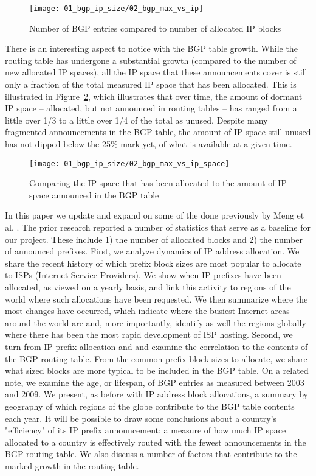 \begin{figure}[htbp]
	\centering
		\texttt{[image: 01\_bgp\_ip\_size/02\_bgp\_max\_vs\_ip]}
	\caption{Number of BGP entries compared to number of allocated IP blocks}
	\label{fig:BGP vs RIR}
\end{figure}

There is an interesting aspect to notice with the BGP table growth. While the
routing table has undergone a substantial growth (compared to the number of
new allocated IP spaces), all the IP space that these announcements cover is
still only a fraction of the total measured IP space that has been allocated.
This is illustrated in Figure~\ref{fig:BGP vs RIR space}, which illustrates
that over time, the amount of dormant IP space -- allocated, but not
announced in routing tables -- has ranged from a little over 1/3 to a little
over 1/4 of the total as unused. Despite many fragmented announcements in the
BGP table, the amount of IP space still unused has not dipped below the 25\%
mark yet, of what is available at a given time.

\begin{figure}[htbp]
	\centering
\texttt{[image: 01\_bgp\_ip\_size/02\_bgp\_max\_vs\_ip\_space]}
	\caption{Comparing the IP space that has been allocated to the amount of IP space announced in the BGP table}
	\label{fig:BGP vs RIR space}
\end{figure}

In this paper we update and expand on some of the done previously by Meng et
al. \cite{Meng:2005:IPv4-address}. The prior research reported a number of
statistics that serve as a baseline for our project. These include 1) the
number of allocated blocks and 2) the number of announced prefixes. First, we
analyze dynamics of IP address allocation. We share the recent history of
which prefix block sizes are most popular to allocate to ISPs (Internet
Service Providers). We show when IP prefixes have been allocated, as viewed on
a yearly basis, and link this activity to regions of the world where such
allocations have been requested. We then summarize where the most changes have
occurred, which indicate where the busiest Internet areas around the world are
and, more importantly, identify as well the regions globally where there has
been the most rapid development of ISP hosting. Second, we turn from IP prefix
allocation and and examine the correlation to the contents of the BGP routing
table. From the common prefix block sizes to allocate, we share what sized
blocks are more typical to be included in the BGP table. On a related note, we
examine the age, or lifespan, of BGP entries as measured between 2003 and
2009. We present, as before with IP address block allocations, a summary by
geography of which regions of the globe contribute to the BGP table contents
each year. It will be possible to draw some conclusions about a country's
"efficiency" of its IP prefix announcement: a measure of how much IP space
allocated to a country is effectively routed with the fewest announcements in
the BGP routing table. We also discuss a number of factors that contribute to
the marked growth in the routing table.


